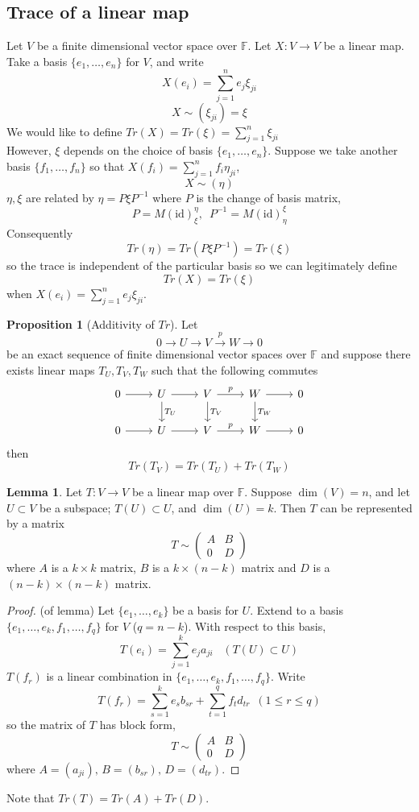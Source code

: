 \documentclass[a4paper,14pt]{extarticle}
\theoremstyle{definition}
\newtheorem*{lemma}{Lemma}
\newtheorem*{proposition}{Proposition}
\begin{document}
\subsection{Trace of a linear map}
Let $V$ be a finite dimensional vector space over $\mathbb{F}$. Let $X:V\rightarrow V$
be a linear map. Take a basis $\{e_1,\ldots,e_n\}$ for $V$, and write 
\[X(e_i)=\sum_{j=1}^n e_j\xi_{ji}\]\[X\sim(\xi_{ji})=\xi\] We would like to define 
$Tr(X)=Tr(\xi)=\sum_{j=1}^n \xi_{ji}$ \\

However, $\xi$ depends on the choice of basis $\{e_1,\ldots,e_n\}$. Suppose we take 
another basis $\{f_1,\ldots,f_n\}$ so that $X(f_i)=\sum_{j=1}^n f_i\eta_{ji}$, \[X\sim(\eta)\]
$\eta,\xi$ are related by $\eta=P\xi P^{-1}$ where $P$ is the change of basis matrix, 
\[P=M(\text{id})_\xi^\eta,\,\,\,P^{-1}=M(\text{id})_\eta^\xi\] Consequently
\[Tr(\eta)=Tr(P\xi P^{-1})=Tr(\xi)\] so the trace is independent of the particular basis 
so we can legitimately define 
\[Tr(X)=Tr(\xi)\] when $X(e_i)=\sum_{j=1}^n e_j\xi_{ji}$.

\begin{proposition}[Additivity of $Tr$]
	Let \[0\rightarrow U\rightarrow V\xrightarrow{p}W\rightarrow 0\] be an 
	exact sequence of finite dimensional vector spaces over $\mathbb{F}$ and suppose 
	there exists linear maps $T_U,T_V,T_W$ such that the following commutes
	\[
	\begin{tikzcd}
		0\arrow{r} & U \arrow{r}
		\arrow{d}{T_U} & V \arrow{r}{p} \arrow{d}{T_V} &
		W \arrow{r}\arrow{d}{T_W} & 0\\
		0 \arrow{r}& U \arrow{r} & V\arrow{r}{p}
		& W \arrow{r} & 0
	\end{tikzcd}
	\]
	then 
	\[Tr(T_V)=Tr(T_U)+Tr(T_W)\]
\end{proposition}

\begin{lemma}
	Let $T:V\rightarrow V$ be a linear map over $\mathbb{F}$. Suppose $\dim(V)=n$, and let 
	$U\subset V$ be a subspace; $T(U)\subset U$, and $\dim(U)=k$. Then $T$ can be 
	represented by a matrix 
	\[T\sim\begin{pmatrix}
		A&B\\0&D
	\end{pmatrix}\] where $A$ is a $k\times k$ matrix, $B$ is a $k\times (n-k)$ matrix and 
	$D$ is a $(n-k)\times(n-k)$ matrix.
\end{lemma}

\begin{proof}(of lemma)
	Let $\{e_1,\ldots,e_k\}$ be a basis for $U$. Extend to a basis $\{e_1,\ldots,e_k,f_1,\ldots,f_q\}$ for $V$ ($q=n-k$). With respect to this basis, 
	\[T(e_i)=\sum_{j=1}^k e_j a_{ji}\,\,\,\,\,(T(U)\subset U)\]
	$T(f_r)$ is a linear combination in $\{e_1,\ldots,e_k,f_1,\ldots,f_q\}$. Write 
	\[T(f_r)=\sum_{s=1}^k e_s b_{sr} + \sum_{t=1}^q f_t d_{tr}\,\,\,(1\leq r\leq q)\]
	so the matrix of $T$ has block form, 
	\[T\sim\begin{pmatrix}
		A&B\\0&D
	\end{pmatrix}\] where $A=(a_{ji}), \,B=(b_{sr}), \,D=(d_{tr})$.
\end{proof}
Note that $Tr(T) = Tr(A) + Tr(D)$.
\end{document}

